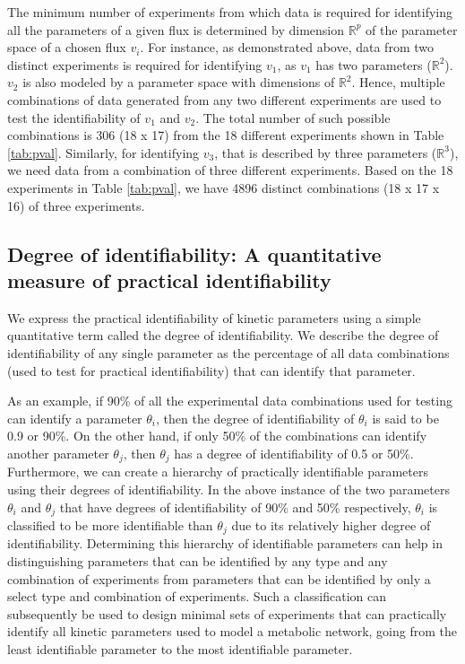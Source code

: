 \documentclass[10pt]{article}
\begin{document}
	The minimum number of experiments from which data is required for identifying all the parameters of a given flux is determined by dimension $\mathbb{R}^p$ of the parameter space of a chosen flux $v_i$. For instance, as demonstrated above, data from two distinct experiments is required for identifying $v_1$, as $v_1$ has two parameters ($\mathbb{R}^2$). $v_2$ is also modeled by a parameter space with dimensions of $\mathbb{R}^2$. Hence, multiple combinations of data generated from any two different experiments are used to test the identifiability of $v_1$ and $v_2$. The total number of such possible combinations is 306 (18 x 17) from the 18 different experiments shown in Table \ref{tab:pval}. Similarly, for identifying $v_3$, that is described by three parameters ($\mathbb{R}^3$), we need data from a combination of three different experiments. Based on the 18 experiments in Table \ref{tab:pval}, we have 4896 distinct combinations (18 x 17 x 16) of three experiments. 
	
	\subsection{Degree of identifiability: A quantitative measure of practical identifiability}\label{sec:degree_of_identifiability}
	We express the practical identifiability of kinetic parameters using a simple quantitative term called the degree of identifiability. We describe the degree of identifiability of any single parameter as the percentage of all data combinations (used to test for practical identifiability) that can identify that parameter. 
	
	As an example, if 90\% of all the experimental data combinations used for testing can identify a parameter $\theta_i$, then the degree of identifiability of $\theta_i$ is said to be 0.9 or 90\%. On the other hand, if only 50\% of the combinations can identify another parameter $\theta_j$, then $\theta_j$ has a degree of identifiability of 0.5 or 50\%. Furthermore, we can create a hierarchy of practically identifiable parameters using their degrees of identifiability. In the above instance of the two parameters $\theta_i$ and $\theta_j$ that have degrees of identifiability of 90\% and 50\% respectively, $\theta_i$ is classified to be more identifiable than $\theta_j$ due to its relatively higher degree of identifiability. Determining this hierarchy of identifiable parameters can help in distinguishing parameters that can be identified by any type and any combination of experiments from parameters that can be identified by only a select type and combination of experiments. Such a classification can subsequently be used to design minimal sets of experiments that can practically identify all kinetic parameters used to model a metabolic network, going from the least identifiable parameter to the most identifiable parameter.  
	
\end{document}
